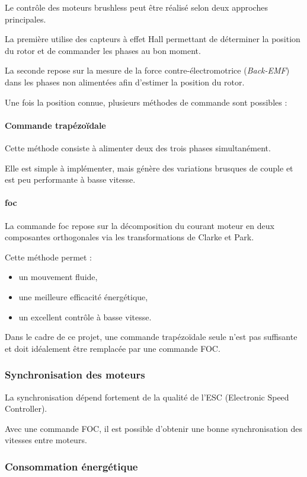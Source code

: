 Le contrôle des moteurs brushless peut être réalisé selon deux approches principales.

La première utilise des capteurs à effet Hall permettant de déterminer la position du rotor et de commander les phases au bon moment.

La seconde repose sur la mesure de la force contre-électromotrice (\textit{Back-EMF}) dans les phases non alimentées afin d'estimer la position du rotor.

Une fois la position connue, plusieurs méthodes de commande sont possibles :

\paragraph{Commande trapézoïdale}
Cette méthode consiste à alimenter deux des trois phases simultanément.

Elle est simple à implémenter, mais génère des variations brusques de couple et est peu performante à basse vitesse.

\paragraph{\Gls{foc}}
La commande \Gls{foc} repose sur la décomposition du courant moteur en deux composantes orthogonales via les transformations de Clarke et Park.

Cette méthode permet :
\begin{itemize}
    \item un mouvement fluide,
    \item une meilleure efficacité énergétique,
    \item un excellent contrôle à basse vitesse.
\end{itemize}

Dans le cadre de ce projet, une commande trapézoïdale seule n'est pas suffisante et doit idéalement être remplacée par une commande FOC.

\subsubsection{Synchronisation des moteurs}

La synchronisation dépend fortement de la qualité de l'ESC (Electronic Speed Controller).

Avec une commande FOC, il est possible d'obtenir une bonne synchronisation des vitesses entre moteurs.

\subsubsection{Consommation énergétique}

